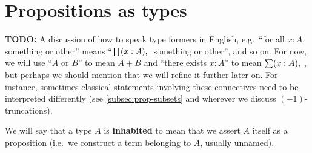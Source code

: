 \section{Propositions as types}
\label{sec:pat}

\textbf{TODO:} A discussion of how to speak type formers in English, e.g.\ ``for all $x:A$, something or other'' means ``$\prd{x:A}$ something or other'', and so on.
For now, we will use ``$A$ or $B$'' to mean $A+B$ and ``there exists $x:A$'' to mean $\sm{x:A}$, but perhaps we should mention that we will refine it further later on.
For instance, sometimes classical statements involving these connectives need to be interpreted differently (see \autoref{subsec:prop-subsets} and wherever we discuss $(-1)$-truncations).

We will say that a type $A$ is \textbf{inhabited} to mean that we assert $A$ itself as a proposition (i.e.\ we construct a term belonging to $A$, usually unnamed).



